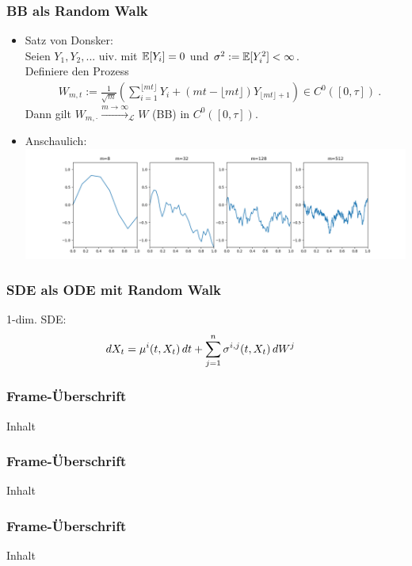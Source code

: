 \begin{frame}
	\frametitle{BB als Random Walk}
	\begin{itemize}
		\item Satz von Donsker:\\
		Seien $Y_1,Y_2,...$ uiv. mit $\mathbb{E}[Y_i]=0$ und $\sigma^2 := \mathbb{E}[Y_i^2] < \infty$.\\
		Definiere den Prozess
		\begin{align*}
		& W_{m,t} := \frac{1}{\sqrt{m}} \left( \sum\limits_{i=1}^{\lfloor mt \rfloor} Y_i + (mt - \lfloor mt \rfloor) Y_{\lfloor mt \rfloor +1}\right) \in C^0([0,\tau]) \ .
		\end{align*}
		Dann gilt $W_{m,\cdot} \xrightarrow{m \rightarrow \infty}_{\mathcal{L}} W$ (BB) in $C^0([0,\tau])$.
		
		\item Anschaulich:\\
		\includegraphics[scale=0.25]{Ben/DonskerBilder.png}
	\end{itemize}
	
\end{frame}


\begin{frame}
	\frametitle{SDE als ODE mit Random Walk}
	1-dim. SDE:
	\begin{align*}
	& dX_t = \bold{\mu}^i(t,X_t) \, dt + \sum\limits_{j=1}^n \bold{\sigma}^{i,j}(t,X_t) \, dW^j
	\end{align*}
	
	
	
	
\end{frame}


\begin{frame}
	\frametitle{Frame-Überschrift}
	Inhalt
\end{frame}


\begin{frame}
	\frametitle{Frame-Überschrift}
	Inhalt
\end{frame}


\begin{frame}
	\frametitle{Frame-Überschrift}
	Inhalt
\end{frame}














